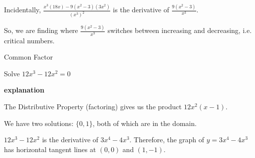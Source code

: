 \documentclass{ximera}
\begin{document}
Incidentally, $\frac{x^3 (18x) - 9(x^2-3)(3x^2)}{(x^3)^2}$ is the derivative of $\frac{9(x^2-3)}{x^3}$.  


So, we are finding where $\frac{9(x^2-3)}{x^3}$ switches between increasing and decreasing, i.e. critical numbers.











\begin{example}  Common Factor


Solve $12 x^3 - 12 x^2 = 0 $



\textbf{\textcolor{red!75!green}{explanation}} 


The Distributive Property (factoring) gives us the product $12 x^2 (x-1)$.




We have two solutions: $\{ 0, 1  \}$, both of which are in the domain.





$12 x^3 - 12 x^2$ is the derivative of $3x^4 - 4x^3$.  Therefore, the graph of $y = 3x^4 - 4x^3$ has horizontal tangent lines at $(0, 0)$ and $(1, -1)$.



\begin{center}
\end{center}


\end{example}
\end{document}
